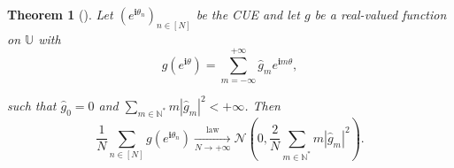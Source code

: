 \documentclass[twoside,11pt]{book}
\newtheorem{theorem}{Theorem}
\numberwithin{theorem}{chapter}
\numberwithin{definition}{chapter}
\numberwithin{proposition}{chapter}
\numberwithin{corollary}{chapter}
\numberwithin{example}{chapter}
\numberwithin{lemma}{chapter}
\numberwithin{assumption}{chapter}
\DeclareMathOperator{\Det}{Det}
\begin{document}
\begin{theorem}[\cite{Joh97}]
Let $(e^{\mathbf{i} \theta_{n}})_{n \in [N]}$ be the CUE and let $g$ be a real-valued function on $\mathbb{U}$ with 
\begin{equation}
g(e^{\mathbf{i}  \theta}) = \sum_{m =-\infty}^{+\infty} \hat{g}_{m}e^{\mathbf{i}  m \theta},
\end{equation}

 such that $\hat{g}_{0} = 0$ and $\sum_{m \in \mathbb{N}^{*}} m|\hat{g}_{m}|^{2} <+\infty$. Then 
 \begin{equation}
  \frac{1}{N}\sum_{n \in [N]} g(e^{\mathbf{i}\theta_{n}}) 
  \xrightarrow[N \rightarrow +\infty]{\text{law}} \mathcal{N}(0,\frac{2}{N}\sum_{m \in \mathbb{N}^{*}} m|\hat{g}_{m}|^{2}).
 \end{equation}

\end{theorem}



\end{document}
